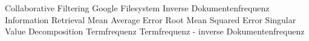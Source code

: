 \begin{acronym}[XXXXXXX]
	\setlength{\itemsep --- }{-\parsep}
  \setlength{\itemsep}{1pt}
  \setlength{\parskip}{0pt}
  \setlength{\parsep}{0pt}
         {Collaborative Filtering}
         {Google Filesystem}
         {Inverse Dokumentenfrequenz}
         {Information Retrieval}
         {Mean Average Error}
         {Root Mean Squared Error}
         {Singular Value Decomposition}
         {Termfrequenz}
         {Termfrequenz - inverse Dokumentenfrequenz}
\end{acronym}
